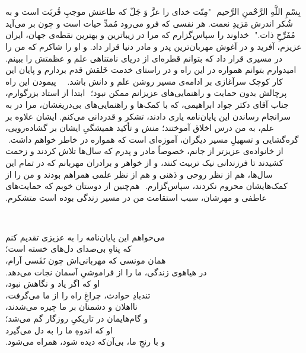 ‫
‫%
‫%
‫%
‫
‫\begin{center}
‫
‫\end{center}
‫بِسْمِ اللَّهِ الرَّحْمنِ الرَّحیم
‫
‫"مِنّت خدای را عزَّ وَ جَلّ که طاعتش موجبِ قُربَت است و به شُکر اندرش مَزیدِ نعمت. هر نفسی که فرو می‌رود مُمدِّ حیات است و چون بر می‌آید مُفَرِّحِ ذات."
‫
‫خداوند را سپاس‌گزارم که مرا در زیباترین و بهترین نقطه‌ی جهان، ایران عزیزم، آفرید و در آغوش مهربان‌ترین پدر و مادر دنیا قرار داد.
‫و او را شاکرم که من را در مسیری قرار داد که بتوانم قطره‌ای از دریای نامتناهی علم و عظمتش را ببینم.
‫امیدوارم بتوانم همواره در این راه و در راستای خدمت خَلقش قدم بردارم و پایان این کار کوچک سرآغازی بر ادامه‌ی مسیر روشن علم و دانش باشد.
‫
‫\vspace{1cm}
‫
‫پیمودن این راه پرچالش بدون حمایت و راهنمایی‌های عزیزانم ممکن نبود؛
‫
‫\noindent ابتدا از استاد بزرگوارم، جناب آقای دکتر جواد ابراهیمی، که با کمک‌ها و راهنمایی‌های بی‌دریغشان، مرا در به سرانجام رساندن این پایان‌نامه یاری دادند، تشکر و قدردانی می‌کنم. ایشان علاوه بر علم، به من درس اخلاق آموختند؛ منش و تأکید همیشگیِ ایشان بر گشاده‌رویی، گره‌گشایی و تسهیلِ مسیر دیگران، آموزه‌ای است که همواره در خاطر خواهم داشت.
‫
‫\noindent از خانواده‌ی عزیزتر از جانم، خصوصاً مادر و پدرم که سال‌ها تلاش کردند و زحمت کشیدند تا فرزندانی نیک تربیت کنند، و از خواهر و برادران مهربانم که در تمام این سال‌ها، هم از نظر روحی و ذهنی و هم از نظر علمی همراهم بودند و من را از کمک‌هایشان محروم نکردند، سپاس‌گزارم.
‫
‫\noindent هم‌چنین از دوستان خوبم که حمایت‌های عاطفی و مهرشان، سبب استقامت من در مسیر زندگی بوده است متشکرم.
‫
‫
‫
‫
‫\newpage
‫\begin{center}
‫
‫\end{center}
‫
‫\noindent می‌خواهم این پایان‌نامه را به عزیزی تقدیم کنم\\
‫که پناهِ بی‌صدای دل‌های خسته است؛\\
‫همان مونسی که مهربانی‌اش چون نَفَسی آرام،\\
‫در هیاهوی زندگی، ما را از فراموشیِ آسمان نجات می‌دهد.\\[0.3cm]
‫\noindent او که اگر یاد و نگاهش نبود،\\
‫تندبادِ حوادث، چراغِ راه را از ما می‌گرفت،\\
‫نااهلان و دشمنان بر ما چیره می‌شدند،\\
‫و گام‌هایمان در تاریکیِ روزگار گم می‌شد؛\\
‫او که اندوهِ ما را به دل می‌گیرد\\
‫و با رنجِ ما، بی‌آن‌که دیده شود، همراه می‌شود.\\[0.3cm]
